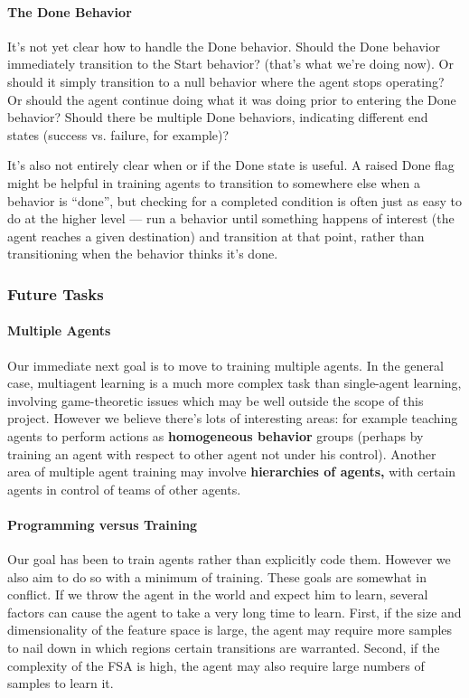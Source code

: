 \documentclass[11pt]{article}
\begin{document}
\paragraph{The Done Behavior}  It's not yet clear how to handle the Done behavior.  Should the Done behavior immediately transition to the Start behavior?  (that's what we're doing now).  Or should it simply transition to a null behavior where the agent stops operating?  Or should the agent continue doing what it was doing prior to entering the Done behavior?  Should there be multiple Done behaviors, indicating different end states (success vs. failure, for example)?

It's also not entirely clear when or if the Done state is useful.  A raised Done flag might be helpful in training agents to transition to somewhere else when a behavior is ``done'', but checking for a completed condition is often just as easy to do at the higher level --- run a behavior until something happens of interest (the agent reaches a given destination) and transition at that point, rather than transitioning when the behavior thinks it's done.

\subsubsection*{Future Tasks}

\paragraph{Multiple Agents}  Our immediate next goal is to move to training multiple agents.  In the general case, multiagent learning is a much more complex task than single-agent learning, involving game-theoretic issues which may be well outside the scope of this project.  However we believe there's lots of interesting areas: for example teaching agents to perform actions as {\bf homogeneous behavior} groups (perhaps by training an agent with respect to other agent not under his control).  Another area of multiple agent training may involve {\bf hierarchies of agents,} with certain agents in control of teams of other agents.

\paragraph{Programming versus Training}  Our goal has been to train agents rather than explicitly code them.  However we also aim to do so with a minimum of training.  These goals are somewhat in conflict.  If we throw the agent in the world and expect him to learn, several factors can cause the agent to take a very long time to learn.  First, if the size and dimensionality of the feature space is large, the agent may require more samples to nail down in which regions certain transitions are warranted.  Second, if the complexity of the FSA is high, the agent may also require large numbers of samples to learn it.
\end{document}
